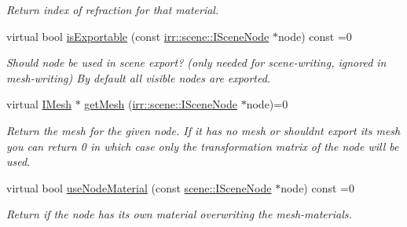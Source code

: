 \begin{DoxyCompactItemize}
\begin{DoxyCompactList}\small\item\em Return index of refraction for that material. \end{DoxyCompactList}\item 
\mbox{\label{classirr_1_1scene_1_1IColladaMeshWriterProperties_af24d1c12b3f4168407c078bd7fc3dc82}} 
virtual bool \hyperlink{classirr_1_1scene_1_1IColladaMeshWriterProperties_af24d1c12b3f4168407c078bd7fc3dc82}{is\+Exportable} (const \hyperlink{classirr_1_1scene_1_1ISceneNode}{irr\+::scene\+::\+I\+Scene\+Node} $\ast$node) const =0
\begin{DoxyCompactList}\small\item\em Should node be used in scene export? (only needed for scene-\/writing, ignored in mesh-\/writing) By default all visible nodes are exported. \end{DoxyCompactList}\item 
\mbox{\label{classirr_1_1scene_1_1IColladaMeshWriterProperties_ac6d9e1583642ac777471bd9225d72007}} 
virtual \hyperlink{classirr_1_1scene_1_1IMesh}{I\+Mesh} $\ast$ \hyperlink{classirr_1_1scene_1_1IColladaMeshWriterProperties_ac6d9e1583642ac777471bd9225d72007}{get\+Mesh} (\hyperlink{classirr_1_1scene_1_1ISceneNode}{irr\+::scene\+::\+I\+Scene\+Node} $\ast$node)=0
\begin{DoxyCompactList}\small\item\em Return the mesh for the given node. If it has no mesh or shouldn\textquotesingle{}t export it\textquotesingle{}s mesh you can return 0 in which case only the transformation matrix of the node will be used. \end{DoxyCompactList}\item 
virtual bool \hyperlink{classirr_1_1scene_1_1IColladaMeshWriterProperties_a9c10df4dc3602efbba6a47b34e2f8f4b}{use\+Node\+Material} (const \hyperlink{classirr_1_1scene_1_1ISceneNode}{scene\+::\+I\+Scene\+Node} $\ast$node) const =0
\begin{DoxyCompactList}\small\item\em Return if the node has it\textquotesingle{}s own material overwriting the mesh-\/materials. \end{DoxyCompactList}\item 
\mbox{\label{classirr_1_1scene_1_1IColladaMeshWriterProperties_abc0fb19092b53bdf48be8cc97a2af63b}} 

\end{DoxyCompactItemize}
